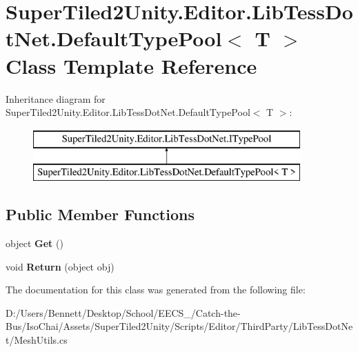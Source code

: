 \hypertarget{class_super_tiled2_unity_1_1_editor_1_1_lib_tess_dot_net_1_1_default_type_pool}{}\section{Super\+Tiled2\+Unity.\+Editor.\+Lib\+Tess\+Dot\+Net.\+Default\+Type\+Pool$<$ T $>$ Class Template Reference}
\label{class_super_tiled2_unity_1_1_editor_1_1_lib_tess_dot_net_1_1_default_type_pool}
Inheritance diagram for Super\+Tiled2\+Unity.\+Editor.\+Lib\+Tess\+Dot\+Net.\+Default\+Type\+Pool$<$ T $>$\+:\begin{figure}[H]
\begin{center}
\leavevmode
\includegraphics[height=2.000000cm]{class_super_tiled2_unity_1_1_editor_1_1_lib_tess_dot_net_1_1_default_type_pool}
\end{center}
\end{figure}
\subsection*{Public Member Functions}
\begin{DoxyCompactItemize}
\item 
\mbox{\label{class_super_tiled2_unity_1_1_editor_1_1_lib_tess_dot_net_1_1_default_type_pool_a7acf4c0cc60caebca40c191f52fccde7}} 
object {\bfseries Get} ()
\item 
\mbox{\label{class_super_tiled2_unity_1_1_editor_1_1_lib_tess_dot_net_1_1_default_type_pool_af44c8009a160651434fefba565359d8b}} 
void {\bfseries Return} (object obj)
\end{DoxyCompactItemize}


The documentation for this class was generated from the following file\+:\begin{DoxyCompactItemize}
\item 
D\+:/\+Users/\+Bennett/\+Desktop/\+School/\+E\+E\+C\+S\+\_/\+Catch-\/the-\/\+Bus/\+Iso\+Chai/\+Assets/\+Super\+Tiled2\+Unity/\+Scripts/\+Editor/\+Third\+Party/\+Lib\+Tess\+Dot\+Net/Mesh\+Utils.\+cs\end{DoxyCompactItemize}
